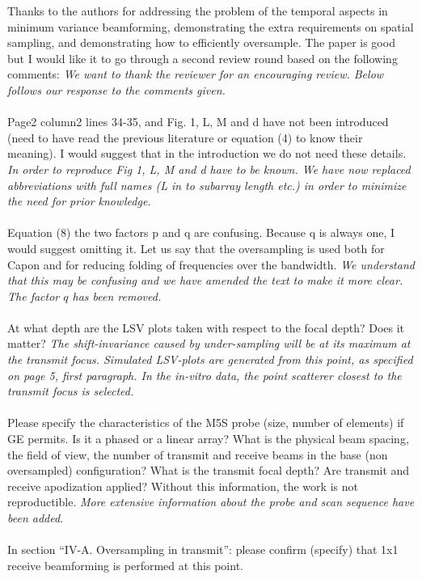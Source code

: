 \documentclass{article}
\begin{document}
Thanks to the authors for addressing the problem of the temporal aspects in minimum variance beamforming, demonstrating the extra requirements on spatial sampling, and demonstrating how to efficiently oversample. The paper is good but I would like it to go through a second review round based on the following comments:
\textit{We want to thank the reviewer for an encouraging review. Below follows our response to the comments given.}
\\\\
Page2 column2 lines 34-35, and Fig. 1, L, M and d have not been introduced (need to have read the previous literature or equation (4) to know their meaning). I would suggest that in the introduction we do not need these details.
\textit{In order to reproduce Fig 1, L, M and d have to be known. We have now replaced abbreviations with full names (L in to subarray length etc.) in order to minimize the need for prior knowledge.}
\\\\
Equation (8) the two factors p and q are confusing. Because q is always one, I would suggest omitting it.  Let us say that the oversampling is used both for Capon and for reducing folding of frequencies over the bandwidth.
\textit{We understand that this may be confusing and we have amended the text to make it more clear. The factor $q$ has been removed.}
\\\\
At what depth are the LSV plots taken with respect to the focal depth? Does it matter?
\textit{The shift-invariance caused by under-sampling will be at its maximum at the transmit focus. Simulated LSV-plots are generated from this point, as specified on page 5, first paragraph. In the in-vitro data, the point scatterer closest to the transmit focus is selected.}
\\\\
Please specify the characteristics of the M5S probe (size, number of elements) if GE permits. Is it a phased or a linear array? What is the physical beam spacing, the field of view, the number of transmit and receive beams in the base (non oversampled) configuration? What is the transmit focal depth? Are transmit and receive apodization applied? Without this information, the work is not reproductible.
\textit{More extensive information about the probe and scan sequence have been added.}
\\\\
In section “IV-A. Oversampling in transmit”: please confirm (specify) that 1x1 receive beamforming is performed at this point.
\end{document}
